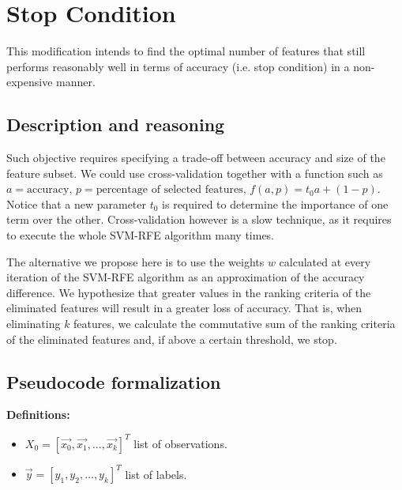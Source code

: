 \newcommand{\VS}{\vspace{6pt}}
\newcommand{\vt}[1]{\vec{#1}}

\chapter{Stop Condition} %

\label{Chapter1} %


This modification intends to find the optimal number of features that still performs reasonably well in terms of accuracy (i.e. stop condition) in a non-expensive manner. 

\section{Description and reasoning}
\label{sec:stopCond.desc}

Such objective requires specifying a trade-off between accuracy and size of the fea\-ture subset. We could use cross-validation together with a function such as $a = \text{accuracy}$, $p = \text{percentage of selected features}$, $f(a, p) = t_0a + (1-p)$. Notice that a new parameter $t_0$ is required to determine the importance of one term over the other. Cross-validation however is a slow technique, as it requires to execute the whole SVM-RFE algorithm many times.

The alternative we propose here is to use the weights $w$ calculated at every iteration of the SVM-RFE algorithm as an approximation of the accuracy difference. We hypothesize that greater values in the ranking criteria of the eliminated fea\-tures will result in a greater loss of accuracy. That is, when eliminating $k$ features, we calculate the commutative sum of the ranking criteria of the eliminated features and, if above a certain threshold, we stop.

\section{Pseudocode formalization}

\textbf{Definitions:}

\begin{itemize}
    \item $X_0 = [\vt{x_0}, \vt{x_1}, \dotsc, \vt{x_k}]^T$ list of observations.
    \item $\vt{y} = [y_1, y_2, \dotsc, y_k]^T$ list of labels.
\end{itemize}

